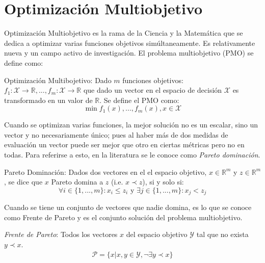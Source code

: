 \section{Optimizaci\'on Multiobjetivo}\label{proposal:moo}
Optimizaci\'on Multiobjetivo es la rama de la Ciencia y la Matem\'atica que se dedica a optimizar varias funciones objetivos sim\'ultaneamente. Es relativamente nueva y un campo activo de investigaci\'on. El problema multiobjetivo (PMO) se define como:
 
\begin{definition}{Optimizaci\'on Multibojetivo:}
     Dado $m$ funciones objetivos: $f_1: \mathcal{X} \rightarrow \mathbb{R}, ..., f_m: \mathcal{X} \rightarrow \mathbb{R}$ que dado un vector en el espacio de decisi\'on $\mathcal{X}$ es transformado en un valor de $\mathbb{R}$. Se define el PMO como:
    \begin{equation*}
        \min f_1(x), ..., f_m(x), x \in \mathcal{X}
    \end{equation*}
\end{definition}

Cuando se optimizan varias funciones, la mejor soluci\'on  no es un escalar, sino un vector y no necesariamente \'unico; pues al haber m\'as de dos medidas de evaluaci\'on un vector puede ser mejor que otro en ciertas m\'etricas pero no en todas. Para referirse a esto, en la literatura se le conoce como \textit{Pareto dominaci\'on}.

\begin{definition}{Pareto Dominaci\'on:}
    Dados dos vectores en el el espacio objetivo, $x \in \mathbb{R}^m$ y $z \in \mathbb{R}^m$, se dice que $x$ Pareto domina a $z$ (i.e. $x \prec z$), si y solo si:
    \begin{equation*}
        \forall i \in \{1, ..., m\}: x_i \leq z_i \text{ y } \exists j \in \{1, ..., m\}: x_j < z_j
    \end{equation*}
\end{definition}

Cuando se tiene un conjunto de vectores que nadie domina, es lo que se conoce como Frente de Pareto y es el conjunto soluci\'on del problema multiobjetivo.

\begin{definition}
    \textit{Frente de Pareto}: Todos los vectores $x$ del espacio objetivo $\mathcal{Y}$ tal que no exista $y \prec x$.
    \begin{align*}
        \mathcal{P} = \{x| x, y \in \mathcal{Y}, \neg \exists y \prec x \} 
    \end{align*}
\end{definition}

